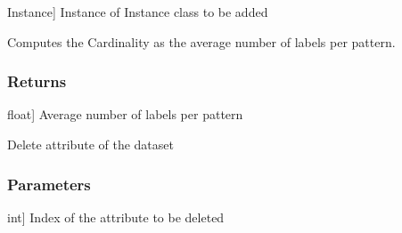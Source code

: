 \documentclass[letterpaper,10pt,english]{sphinxmanual}
\begin{document}
\begin{fulllineitems}
\begin{fulllineitems}
\begin{description}
\sphinxlineitem{instance}{[}Instance{]}
\sphinxAtStartPar
Instance of Instance class to be added

\end{description}

\end{fulllineitems}


\begin{fulllineitems}
\label{\detokenize{data/_autosummary/miml.data.miml_dataset.MIMLDataset:miml.data.miml_dataset.MIMLDataset.cardinality}}
\pysigstartsignatures
{}
\pysigstopsignatures
\sphinxAtStartPar
Computes the Cardinality as the average number of labels per pattern.


\subsubsection{Returns}
\label{\detokenize{data/_autosummary/miml.data.miml_dataset.MIMLDataset:returns}}\begin{description}
\sphinxlineitem{cardinality}{[}float{]}
\sphinxAtStartPar
Average number of labels per pattern

\end{description}

\end{fulllineitems}


\begin{fulllineitems}
\label{\detokenize{data/_autosummary/miml.data.miml_dataset.MIMLDataset:miml.data.miml_dataset.MIMLDataset.delete_attribute}}
\pysigstartsignatures
{}
\pysigstopsignatures
\sphinxAtStartPar
Delete attribute of the dataset


\subsubsection{Parameters}
\label{\detokenize{data/_autosummary/miml.data.miml_dataset.MIMLDataset:id3}}\begin{description}
\sphinxlineitem{position}{[}int{]}
\sphinxAtStartPar
Index of the attribute to be deleted


\end{description}
\end{fulllineitems}
\end{fulllineitems}
\end{document}
